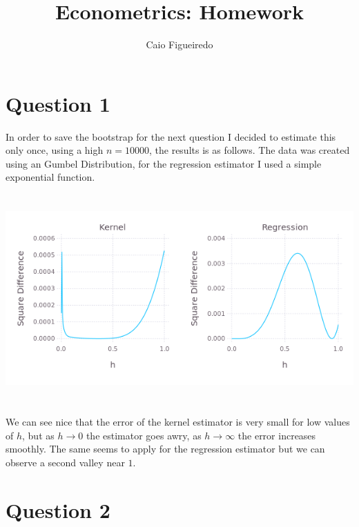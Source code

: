 \documentclass{article}
\title{Econometrics: Homework} %
\author{Caio Figueiredo} %
\begin{document}
\maketitle %


\section{Question 1}

In order to save the bootstrap for the next question I decided to estimate
this only once, using a high $n = 10000$, the results is as follows. The data
was created using an Gumbel Distribution, for the regression estimator I used
a simple exponential function.

\begin{center}
\includegraphics[width=16cm, height=8cm]{Q1.png}
\end{center}

We can see nice that the error of the kernel estimator is very small for
low values of $h$, but as $h \rightarrow 0$ the estimator goes awry, as 
$h \rightarrow \infty$ the error increases smoothly. The same seems to
apply for the regression estimator but we can observe a second valley near $1$.


\section{Question 2}
\end{document}
